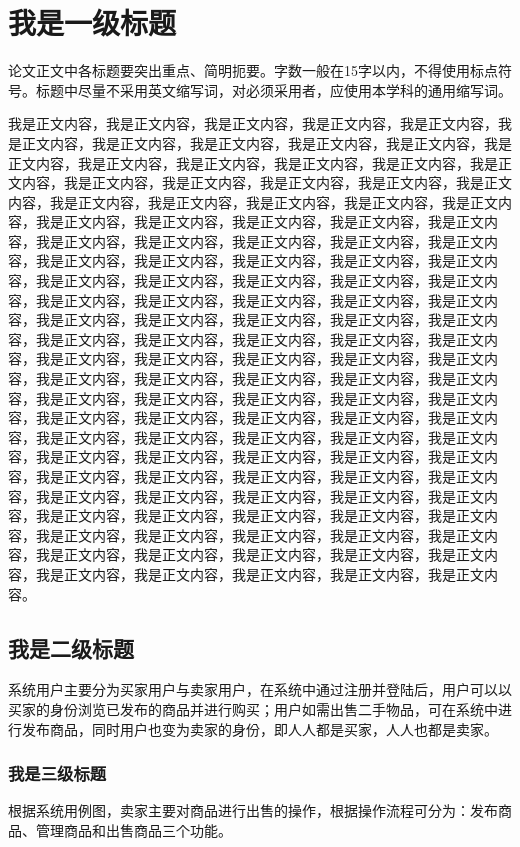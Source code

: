 
\chapter{我是一级标题}
论文正文中各标题要突出重点、简明扼要。字数一般在15字以内，不得使用标点符号。标题中尽量不采用英文缩写词，对必须采用者，应使用本学科的通用缩写词。

我是正文内容，我是正文内容，我是正文内容，我是正文内容，我是正文内容，我是正文内容，我是正文内容，我是正文内容，我是正文内容，我是正文内容，我是正文内容，我是正文内容，我是正文内容，我是正文内容，我是正文内容，我是正文内容，我是正文内容，我是正文内容，我是正文内容，我是正文内容，我是正文内容，我是正文内容，我是正文内容，我是正文内容，我是正文内容，我是正文内容，我是正文内容，我是正文内容，我是正文内容，我是正文内容，我是正文内容，我是正文内容，我是正文内容，我是正文内容，我是正文内容，我是正文内容，我是正文内容，我是正文内容，我是正文内容，我是正文内容，我是正文内容，我是正文内容，我是正文内容，我是正文内容，我是正文内容，我是正文内容，我是正文内容，我是正文内容，我是正文内容，我是正文内容，我是正文内容，我是正文内容，我是正文内容，我是正文内容，我是正文内容，我是正文内容，我是正文内容，我是正文内容，我是正文内容，我是正文内容，我是正文内容，我是正文内容，我是正文内容，我是正文内容，我是正文内容，我是正文内容，我是正文内容，我是正文内容，我是正文内容，我是正文内容，我是正文内容，我是正文内容，我是正文内容，我是正文内容，我是正文内容，我是正文内容，我是正文内容，我是正文内容，我是正文内容，我是正文内容，我是正文内容，我是正文内容，我是正文内容，我是正文内容，我是正文内容，我是正文内容，我是正文内容，我是正文内容，我是正文内容，我是正文内容，我是正文内容，我是正文内容，我是正文内容，我是正文内容，我是正文内容，我是正文内容，我是正文内容，我是正文内容，我是正文内容，我是正文内容，我是正文内容，我是正文内容，我是正文内容，我是正文内容，我是正文内容，我是正文内容，我是正文内容，我是正文内容，我是正文内容，我是正文内容，我是正文内容，我是正文内容，我是正文内容，我是正文内容，我是正文内容，我是正文内容，我是正文内容，我是正文内容，我是正文内容，我是正文内容，我是正文内容。
\section{我是二级标题}
系统用户主要分为买家用户与卖家用户，在系统中通过注册并登陆后，用户可以以买家的身份浏览已发布的商品并进行购买；用户如需出售二手物品，可在系统中进行发布商品，同时用户也变为卖家的身份，即人人都是买家，人人也都是卖家。
\subsection{我是三级标题}
根据系统用例图，卖家主要对商品进行出售的操作，根据操作流程可分为：发布商品、管理商品和出售商品三个功能。
